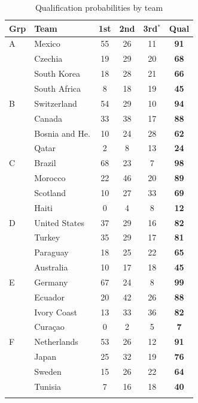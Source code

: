 \documentclass[11pt,letterpaper]{article}
\begin{document}
\begin{table}[htpb!]
  \centering
  \caption{Qualification probabilities by team}\label{tab:qual}
  \begin{threeparttable}
    {\scriptsize
\begin{minipage}{0.49\textwidth}\centering
\begin{tabular}{llcccc}
\toprule
Grp & Team & 1st & 2nd & 3rd$^{*}$ & Qual \\
\midrule
A & Mexico & 55 & 26 & 11 & \textbf{91} \\
 & Czechia & 19 & 29 & 20 & \textbf{68} \\
 & South Korea & 18 & 28 & 21 & \textbf{66} \\
 & South Africa & 8 & 18 & 19 & \textbf{45} \\
\addlinespace
B & Switzerland & 54 & 29 & 10 & \textbf{94} \\
 & Canada & 33 & 38 & 17 & \textbf{88} \\
 & Bosnia and He. & 10 & 24 & 28 & \textbf{62} \\
 & Qatar & 2 & 8 & 13 & \textbf{24} \\
\addlinespace
C & Brazil & 68 & 23 & 7 & \textbf{98} \\
 & Morocco & 22 & 46 & 20 & \textbf{89} \\
 & Scotland & 10 & 27 & 33 & \textbf{69} \\
 & Haiti & 0 & 4 & 8 & \textbf{12} \\
\addlinespace
D & United States & 37 & 29 & 16 & \textbf{82} \\
 & Turkey & 35 & 29 & 17 & \textbf{81} \\
 & Paraguay & 18 & 25 & 22 & \textbf{65} \\
 & Australia & 10 & 17 & 18 & \textbf{45} \\
\addlinespace
E & Germany & 67 & 24 & 8 & \textbf{99} \\
 & Ecuador & 20 & 42 & 26 & \textbf{88} \\
 & Ivory Coast & 13 & 33 & 36 & \textbf{82} \\
 & Curaçao & 0 & 2 & 5 & \textbf{7} \\
\addlinespace
F & Netherlands & 53 & 26 & 12 & \textbf{91} \\
 & Japan & 25 & 32 & 19 & \textbf{76} \\
 & Sweden & 15 & 26 & 22 & \textbf{64} \\
 & Tunisia & 7 & 16 & 18 & \textbf{40} \\
\addlinespace
\bottomrule
\end{tabular}

\end{minipage}}
\end{threeparttable}
\end{table}
\end{document}
